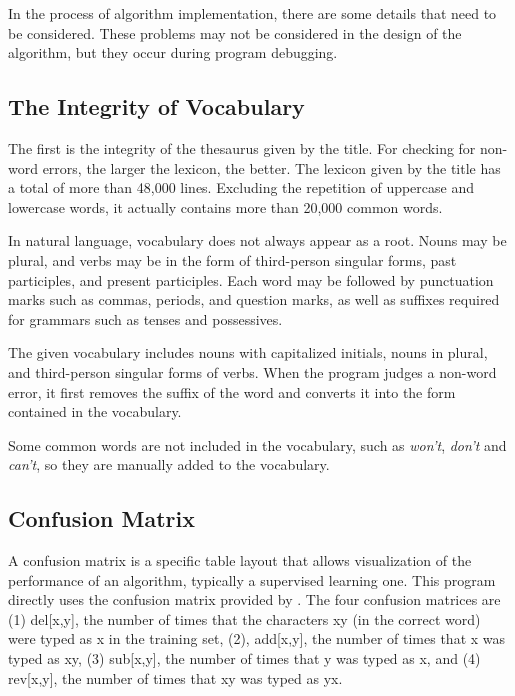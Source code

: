 \documentclass{article}
\begin{document}
    In the process of algorithm implementation, there are some details that need to be considered.
    These problems may not be considered in the design of the algorithm, but they occur during program debugging.

    \subsection{The Integrity of Vocabulary}
    \label{subsec:the-integrity-of-vocabulary}

    The first is the integrity of the thesaurus given by the title.
    For checking for non-word errors, the larger the lexicon, the better.
    The lexicon given by the title has a total of more than 48,000 lines.
    Excluding the repetition of uppercase and lowercase words, it actually contains more than 20,000 common words.

    In natural language, vocabulary does not always appear as a root.
    Nouns may be plural, and verbs may be in the form of third-person singular forms, past participles, and present participles.
    Each word may be followed by punctuation marks such as commas, periods, and question marks, as well as suffixes required for grammars such as tenses and possessives.

    The given vocabulary includes nouns with capitalized initials, nouns in plural, and third-person singular forms of verbs.
    When the program judges a non-word error, it first removes the suffix of the word and converts it into the form contained in the vocabulary.

    Some common words are not included in the vocabulary, such as \textit{won't}, \textit{don't} and \textit{can't}, so they are manually added to the vocabulary.
    
    \subsection{Confusion Matrix}
    \label{subsec:confusion-matrix}
    
    A confusion matrix is a specific table layout that allows visualization of the performance of an algorithm, typically a supervised learning one.
    This program directly uses the confusion matrix provided by \cite{kernighan1990spelling}.
    The four confusion matrices are (1) del[x,y], the number of times that the characters xy (in the correct word) were typed as x in the training set, (2), add[x,y], the number of times that x was typed as xy, (3) sub[x,y], the number of times that y was typed as x, and (4) rev[x,y], the number of times that xy was typed as yx.
\end{document}
